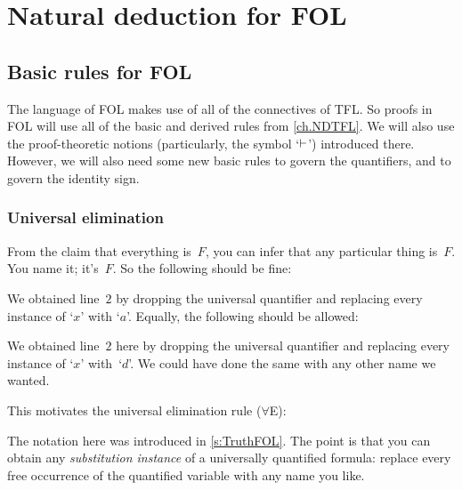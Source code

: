 \part{Natural deduction for FOL}
\label{ch.NDFOL}

\chapter{Basic rules for FOL}\label{s:BasicFOL}

The language of FOL makes use of all of the connectives of TFL. So proofs in FOL will use all of the basic and derived rules from \cref{ch.NDTFL}. We will also use the proof-theoretic notions (particularly, the symbol `$\vdash$') introduced there. However, we will also need some new basic rules to govern the quantifiers, and to govern the identity sign.


\section{Universal elimination}\label{s:forallElim}

From the claim that everything is~$F$, you can infer that any particular thing is~$F$. You name it; it's~$F$. So the following should be fine:
\begin{fitchproof}
	\PR
	 
\end{fitchproof}
We obtained line~$2$ by dropping the universal quantifier and replacing every instance of `$x$' with `$a$'. Equally, the following should be allowed:
\begin{fitchproof}
	\PR
	 
\end{fitchproof}
We obtained line~$2$ here by dropping the universal quantifier and replacing every instance of `$x$' with~`$d$'. We could have done the same with any other name we wanted.

This motivates the universal elimination rule ($\forall$E):


The notation here was introduced in \cref{s:TruthFOL}. The point is
that you can obtain any \emph{substitution instance} of a universally
quantified formula: replace every free occurrence of the quantified
variable with any name you like.

